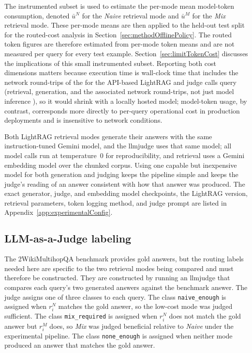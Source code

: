 \documentclass[english, bibtex]{kththesis}               %
\numberwithin{listing}{chapter}
\providecommand{\DIFaddtex}[1]{{\protect\color{blue} \sf #1}} %
\providecommand{\DIFdeltex}[1]{{\protect\color{red} \scriptsize #1}} %
\providecommand{\DIFaddbegin}{} %
\providecommand{\DIFaddend}{} %
\providecommand{\DIFdelbegin}{} %
\providecommand{\DIFdelend}{} %
\providecommand{\DIFadd}[1]{\texorpdfstring{\DIFaddtex{#1}}{#1}} %
\providecommand{\DIFdel}[1]{\texorpdfstring{\DIFdeltex{#1}}{}} %
\begin{document}
\DIFaddend The instrumented subset is used to estimate the per-mode mean model-token consumption, denoted $\bar{u}^N$ for the \emph{Naive} retrieval mode and $\bar{u}^M$ for the \emph{Mix} retrieval mode. These per-mode means are then applied to the held-out test split for the routed-cost analysis in Section~\ref{sec:methodOfflinePolicy}. The routed token figures are therefore estimated from per-mode token means and are not measured per query for every test example. Section~\ref{sec:limitTokenCost} discusses the implications of this small instrumented subset. Reporting both cost dimensions matters because execution time is wall-clock time \DIFdelbegin \DIFdel{that includes the network round-trips of the }\DIFdelend \DIFaddbegin \DIFadd{for the }\DIFaddend API-based LightRAG \DIFdelbegin \DIFdel{and judge calls}\DIFdelend \DIFaddbegin \DIFadd{query (retrieval, generation, and the associated network round-trips}\DIFaddend , not just model inference\DIFaddbegin \DIFadd{)}\DIFaddend , so it would shrink with a locally hosted model; model-token usage, by contrast, corresponds more directly to per-query operational cost in production deployments and is insensitive to network conditions.
\DIFaddbegin 

\DIFaddend Both LightRAG retrieval modes generate their answers with the same instruction-tuned Gemini model, and the \gls{llmjudge} uses that same model; all model calls run at temperature~$0$ for reproducibility, and retrieval uses a Gemini embedding model over the chunked corpus. Using one capable but inexpensive model for both generation and judging keeps the pipeline simple and keeps the judge's reading of an answer consistent with how that answer was produced. The exact generator, judge, and embedding model checkpoints, the LightRAG version, retrieval parameters, token logging method, and judge prompt are listed in Appendix~\ref{app:experimentalConfig}.

\subsection{LLM-as-a-Judge labeling}
\label{sec:methodJudge}

The 2WikiMultihopQA benchmark provides gold answers, but the routing labels needed here are specific to the two retrieval modes being compared and must therefore be constructed. They are constructed by running an \gls{llmjudge} \cite{zheng2023judge} that compares each query's two generated answers against the benchmark answer. The judge assigns one of three classes to each query. The class \texttt{naive\_enough} is assigned when \(r_i^N\) matches the gold answer, so the low-cost mode was judged sufficient. The class \texttt{mix\_required} is assigned when \(r_i^N\) does not match the gold answer but \(r_i^M\) does, so \emph{Mix} was judged beneficial relative to \emph{Naive} under the experimental pipeline. The class \texttt{none\_enough} is assigned when neither mode produced an answer that matches the gold answer.
\end{document}
